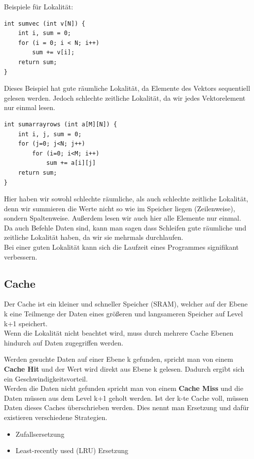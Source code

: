 \documentclass[a4paper,12pt,leqno]{article}
\begin{document}
Beispiele für Lokalität:

\begin{lstlisting}
int sumvec (int v[N]) {
	int i, sum = 0;
	for (i = 0; i < N; i++)
		sum += v[i];
	return sum;
}
\end{lstlisting}
Dieses Beispiel hat gute räumliche Lokalität, da Elemente des Vektors sequentiell gelesen werden.
Jedoch schlechte zeitliche Lokalität, da wir jedes Vektorelement nur einmal lesen.

\begin{lstlisting}
int sumarrayrows (int a[M][N]) {
	int i, j, sum = 0;
	for (j=0; j<N; j++)
		for (i=0; i<M; i++)
			sum += a[i][j]
	return sum;
}
\end{lstlisting}
Hier haben wir sowohl schlechte räumliche, als auch schlechte zeitliche Lokalität, denn wir summieren die Werte nicht so wie im Speicher liegen (Zeilenweise), sondern Spaltenweise. Außerdem lesen wir auch hier alle Elemente nur einmal.\\

Da auch Befehle Daten sind, kann man sagen dass Schleifen gute räumliche und zeitliche Lokalität haben, da wir sie mehrmals durchlaufen.\\

Bei einer guten Lokalität kann sich die Laufzeit eines Programmes signifikant verbessern.

\subsection{Cache}
Der Cache ist ein kleiner und schneller Speicher (SRAM), welcher auf der Ebene k eine Teilmenge der Daten eines größeren und langsameren Speicher auf Level k+1 speichert.\\
Wenn die Lokalität nicht beachtet wird, muss durch mehrere Cache Ebenen hindurch auf Daten zugegriffen werden.

Werden gesuchte Daten auf einer Ebene k gefunden, spricht man von einem \textbf{Cache Hit} und der Wert wird direkt aus Ebene k gelesen. Dadurch ergibt sich ein Geschwindigkeitsvorteil.\\

Werden die Daten nicht gefunden spricht man von einem \textbf{Cache Miss} und die Daten müssen aus dem Level k+1 geholt werden. Ist der k-te Cache voll, müssen Daten dieses Caches überschrieben werden. Dies nennt man Ersetzung und dafür existieren verschiedene Strategien. 
\begin{itemize}
\item Zufallsersetzung
\item Least-recently used (LRU) Ersetzung
\end{itemize} 
\end{document}
